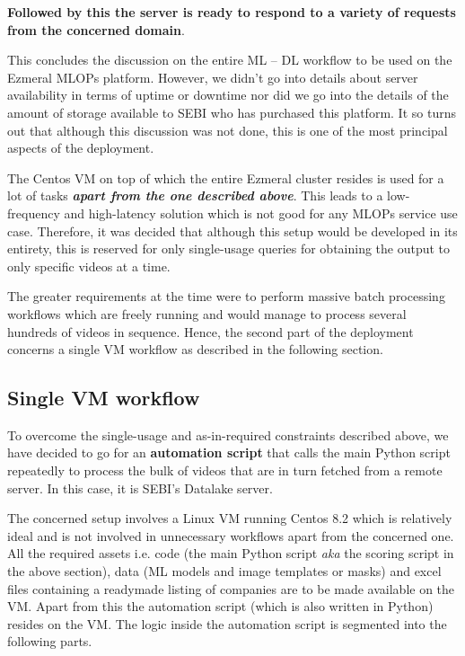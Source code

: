 \begin{enumerate}
\textbf{Followed by this the server is ready to respond to a variety of requests from the concerned domain}.
\end{enumerate}

This concludes the discussion on the entire ML – DL workflow to be used on the Ezmeral MLOPs platform. However, we didn’t go into details about server availability in terms of uptime or downtime nor did we go into the details of the amount of storage available to SEBI who has purchased this platform. It so turns out that although this discussion was not done, this is one of the most principal aspects of the deployment. \par

The Centos VM on top of which the entire Ezmeral cluster resides is used for a lot of tasks \textbf{\textit{apart from the one described above}}. This leads to a low-frequency and high-latency solution which is not good for any MLOPs service use case. Therefore, it was decided that although this setup would be developed in its entirety, this is reserved for only single-usage queries for obtaining the output to only specific videos at a time. \par

The greater requirements at the time were to perform massive batch processing workflows which are freely running and would manage to process several hundreds of videos in sequence. Hence, the second part of the deployment concerns a single VM workflow as described in the following section.

\subsection{Single VM workflow} \label{vm}

To overcome the single-usage and as-in-required constraints described above, we have decided to go for an \textbf{automation script} that calls the main Python script repeatedly to process the bulk of videos that are in turn fetched from a remote server. In this case, it is SEBI’s Datalake server. \par

The concerned setup involves a Linux VM running Centos 8.2 which is relatively ideal and is not involved in unnecessary workflows apart from the concerned one. All the required assets i.e. code (the main Python script \textit{aka} the scoring script in the above section), data (ML models and image templates or masks) and excel files containing a readymade listing of companies are to be made available on the VM. Apart from this the automation script (which is also written in Python) resides on the VM. The logic inside the automation script is segmented into the following parts.

